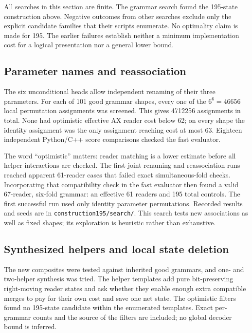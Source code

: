 \documentclass[11pt,a4paper]{article}
\newcommand{\file}[1]{\texttt{\nolinkurl{#1}}}
\begin{document}
All searches in this section are finite. The grammar search found the
195-state construction above. Negative outcomes from other searches exclude
only the explicit candidate families that their scripts enumerate.
No optimality claim is made for 195. The earlier failures establish neither
a minimum implementation cost for a logical presentation nor a general
lower bound.

\subsection{Parameter names and reassociation}

The six unconditional heads allow independent renaming of their three
parameters. For each of 101 good grammar shapes, every one of the
$6^6=46656$ local permutation assignments was screened. This gives
4712256 assignments in total. None had optimistic effective AX reader
cost below 62; on every shape the identity assignment was the only
assignment reaching cost at most 63. Eighteen independent Python/C++
score comparisons checked the fast evaluator.

The word ``optimistic'' matters: reader matching is a lower estimate
before all helper interactions are checked. The first joint renaming and reassociation runs reached apparent 61-reader
cases that failed exact simultaneous-fold checks. Incorporating that
compatibility check in the fast evaluator then found a valid 67-reader,
six-fold grammar: an effective 61 readers and 195 total controls.
The first successful run used only identity parameter permutations.
Recorded results and seeds are in \file{construction195/search/}. This search
tests new associations as well as fixed shapes; its exploration is
heuristic rather than exhaustive.

\subsection{Synthesized helpers and local state deletion}

The new composites were tested against inherited good grammars, and
one- and two-helper synthesis was tried. The helper templates add pure
bit-preserving right-moving reader states and ask whether they enable
enough extra compatible merges to pay for their own cost and save one
net state. The optimistic filters found no 195-state candidate within
the enumerated templates. Exact per-grammar counts and the source of
the filters are included; no global decoder bound is inferred.
\end{document}
